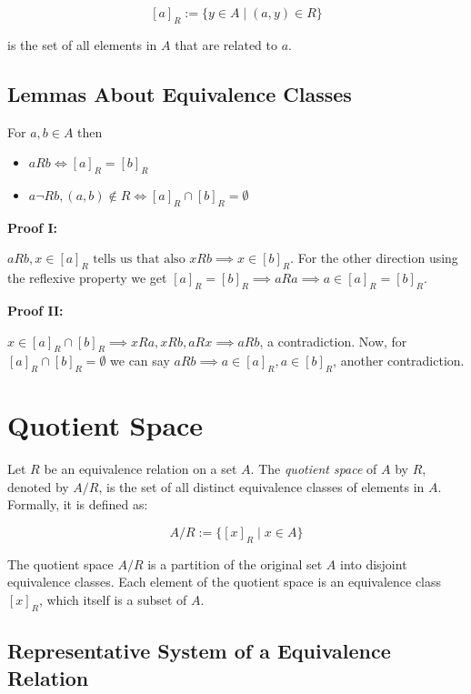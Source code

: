 \[
	[a]_R := \{y \in A \mid (a,y) \in R\}
\]

is the set of all elements in \(A\) that are related to \(a\).

\subsection{Lemmas About Equivalence Classes}

For \(a,b \in A\) then

\begin{itemize}

	\item \(aRb \iff [a]_R = [b]_R\)

	\item \(a \neg R b, (a,b) \notin R \iff [a]_R \cap [b]_R = \emptyset \)

\end{itemize}

\textbf{Proof I:}

\(aRb, x \in [a]_R \text{ tells us that also } x R b \implies x \in [b]_R \). For the other direction
using the reflexive property we get \([a]_R = [b]_R \implies a R a \implies a \in [a]_R = [b]_R\).

\QED

\textbf{Proof II:}

\(x \in [a]_R \cap [b]_R \implies x R a, x R b, a R x \implies a R b\), a contradiction.
Now, for \( [a]_R \cap [b]_R = \emptyset\) we can say \(a R b \implies a \in [a]_R, a \in [b]_R \), another contradiction.

\QED

\section{Quotient Space}

Let \(R\) be an equivalence relation on a set \(A\). The \emph{quotient space} of \(A\) by
\(R\), denoted by \(A / R\), is the set of all distinct equivalence classes of
elements in \(A\). Formally, it is defined as:

\[
	A / R := \{[x]_R \mid x \in A\}
\]

The quotient space \(A/R\) is a partition of the original set \(A\) into disjoint equivalence classes.
Each element of the quotient space is an equivalence class \([x]_R\), which itself is a subset of \(A\).

\subsection{Representative System of a Equivalence Relation}

